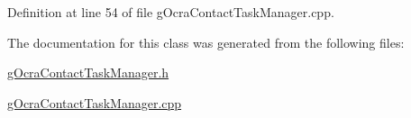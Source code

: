 Definition at line 54 of file g\+Ocra\+Contact\+Task\+Manager.\+cpp.



The documentation for this class was generated from the following files\+:\begin{DoxyCompactItemize}
\item 
\hyperlink{gOcraContactTaskManager_8h}{g\+Ocra\+Contact\+Task\+Manager.\+h}\item 
\hyperlink{gOcraContactTaskManager_8cpp}{g\+Ocra\+Contact\+Task\+Manager.\+cpp}\end{DoxyCompactItemize}
